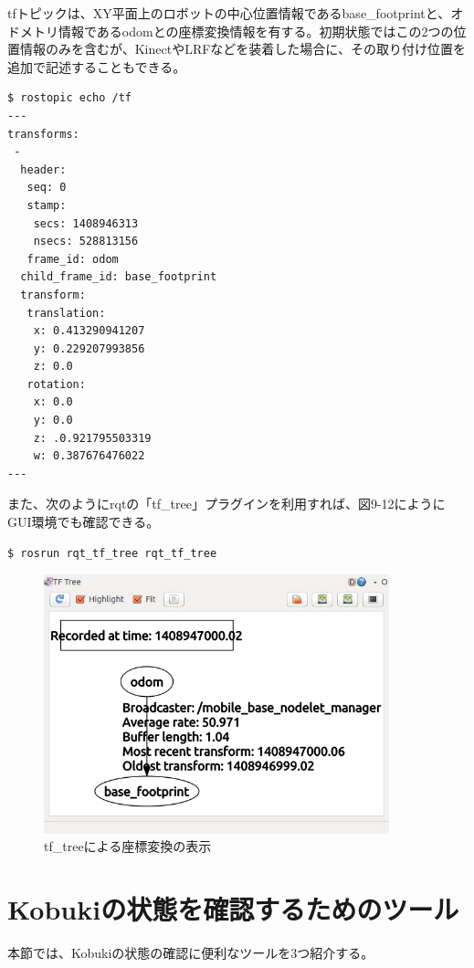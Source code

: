 \begin{itemize}
tfトピックは、XY平面上のロボットの中心位置情報であるbase\_footprintと、オドメトリ情報であるodomとの座標変換情報を有する。初期状態ではこの2つの位置情報のみを含むが、KinectやLRFなどを装着した場合に、その取り付け位置を追加で記述することもできる。

\begin{lstlisting}[language=ROS]
$ rostopic echo /tf
---
transforms:
 -
  header:
   seq: 0
   stamp:
    secs: 1408946313
    nsecs: 528813156
   frame_id: odom
  child_frame_id: base_footprint
  transform:
   translation:
    x: 0.413290941207
    y: 0.229207993856
    z: 0.0
   rotation:
    x: 0.0
    y: 0.0
    z: .0.921795503319
    w: 0.387676476022
---
\end{lstlisting}

また、次のようにrqtの「tf\_tree」プラグインを利用すれば、図9-12にようにGUI環境でも確認できる。

\begin{lstlisting}[language=ROS]
$ rosrun rqt_tf_tree rqt_tf_tree
\end{lstlisting}

\begin{figure}[htp]
  \centering
  \includegraphics[width=10cm]{pictures/chapter9/pic_09_12.png}
  \caption{tf\_treeによる座標変換の表示}
\end{figure}


\section{Kobukiの状態を確認するためのツール}

本節では、Kobukiの状態の確認に便利なツールを3つ紹介する。


\end{itemize}
